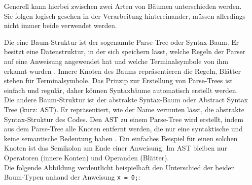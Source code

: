 Generell kann hierbei zwischen zwei Arten von Bäumen unterschieden werden. Sie folgen logisch gesehen in der Verarbeitung hintereinander, müssen allerdings nicht immer beide verwendet werden.

Die eine Baum-Struktur ist der sogenannte Parse-Tree oder Syntax-Baum. Er besitzt eine Datenstruktur, in der sich speichern lässt, welche Regeln der Parser auf eine Anweisung angewendet hat und welche Terminalsymbole von ihm erkannt wurden \cite{book:parrLang}. Innere Knoten des Baums repräsentieren die Regeln, Blätter stehen für Terminalsymbole. Das Prinzip zur Erstellung von Parse-Trees ist einfach und regulär, daher können Syntaxbäume automatisch erstellt werden.\\
Die andere Baum-Struktur ist der abstrakte Syntax-Baum oder Abstract Syntax Tree (kurz: AST). Er repräsentiert, wie der Name vermuten lässt, die abstrakte Syntax-Struktur des Codes. Den AST zu einem Parse-Tree wird erstellt, indem aus dem Parse-Tree alle Knoten entfernt werden, die nur eine syntaktische und keine semantische Bedeutung haben \cite{book:parrLang}. Ein einfaches Beispiel für einen solchen Knoten ist das Semikolon am Ende einer Anweisung. Im AST bleiben nur Operatoren (innere Konten) und Operanden (Blätter).\\
Die folgende Abbildung verdeutlicht beispielhaft den Unterschied der beiden Baum-Typen anhand der Anweisung \texttt{x = 0;}:

